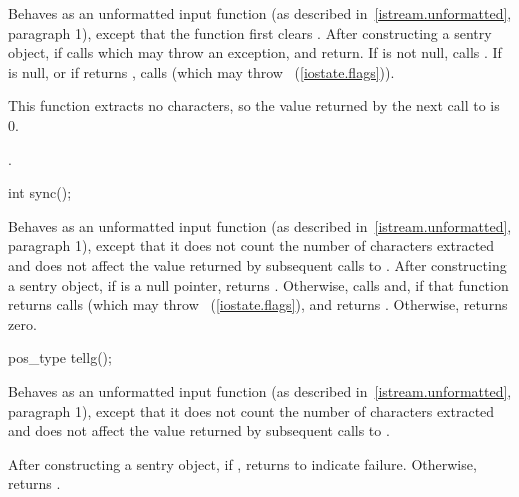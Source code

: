 \begin{itemdescr}
\pnum
\effects
Behaves as an unformatted input function (as described in~\ref{istream.unformatted}, paragraph
1), except that the function first clears .
After constructing
a sentry object, if
calls
which may throw an exception,
and return.
If
is not null, calls
.
If
is null, or if
returns
,
calls
(which may throw
~(\ref{iostate.flags})).
\begin{note}
This
function extracts no characters, so the value returned by the next call to
is 0.
\end{note}

\pnum
\returns
{}.
\end{itemdescr}

%
\begin{itemdecl}
int sync();
\end{itemdecl}

\begin{itemdescr}
\pnum
\effects
Behaves as an unformatted input function (as described in~\ref{istream.unformatted}, paragraph 1), except that it does not
count the number of characters extracted and does not affect the
value returned by subsequent calls to
.
After constructing
a sentry object, if
is a null pointer, returns .
Otherwise, calls
and, if that function returns 
calls
(which may throw
~(\ref{iostate.flags}),
and returns
.
Otherwise, returns zero.
\end{itemdescr}

%
\begin{itemdecl}
pos_type tellg();
\end{itemdecl}

\begin{itemdescr}
\pnum
\effects
Behaves as an unformatted input function (as described in~\ref{istream.unformatted}, paragraph 1), except that it does not count
the number of characters extracted and does not affect the value
returned by subsequent calls to
.

\pnum
\returns
After constructing a sentry object, if
,
returns
to indicate failure.
Otherwise, returns
.
\end{itemdescr}

